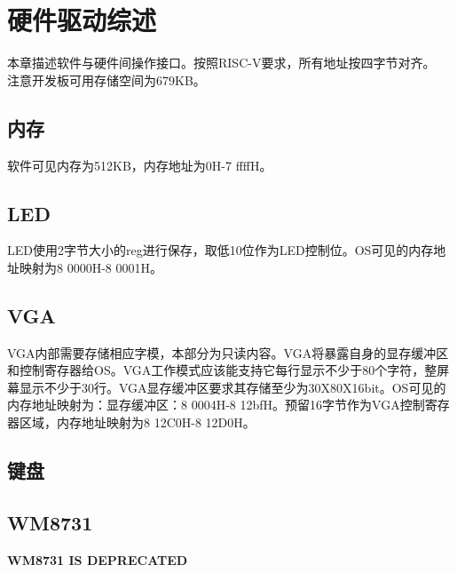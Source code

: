 %
% 
% 
% 
% 
% 
% 
%

\chapter{硬件驱动综述}
本章描述软件与硬件间操作接口。按照RISC-V要求，所有地址按四字节对齐。\\
注意开发板可用存储空间为679KB。
\section{内存}
软件可见内存为512KB，内存地址为0H-7 ffffH。
\section{LED}
LED使用2字节大小的reg进行保存，取低10位作为LED控制位。OS可见的内存地址映射为8 0000H-8 0001H。
\section{VGA}
VGA内部需要存储相应字模，本部分为只读内容。VGA将暴露自身的显存缓冲区和控制寄存器给OS。VGA工作模式应该能支持它每行显示不少于80个字符，整屏幕显示不少于30行。VGA显存缓冲区要求其存储至少为30X80X16bit。OS可见的内存地址映射为：显存缓冲区：8 0004H-8 12bfH。预留16字节作为VGA控制寄存器区域，内存地址映射为8 12C0H-8 12D0H。
\section{键盘}
\section{WM8731}
\textbf{WM8731 IS DEPRECATED}
